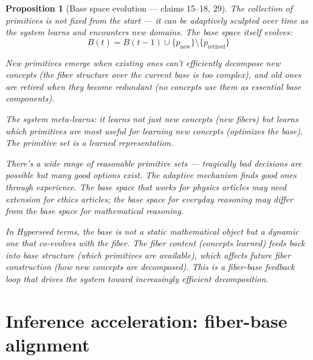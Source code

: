 \documentclass[11pt,a4paper]{article}
\newtheorem{proposition}[definition]{Proposition}
\begin{document}
\begin{proposition}[Base space evolution --- claims 15--18, 29]
\label{prop:adaptive}
The collection of primitives is not fixed from the start --- it can be
adaptively sculpted over time as the system learns and encounters new
domains. The base space itself evolves:
\[
  B(t) = B(t-1) \cup \{p_{\text{new}}\} \setminus \{p_{\text{retired}}\}
\]

New primitives emerge when existing ones can't efficiently decompose new
concepts (the fiber structure over the current base is too complex),
and old ones are retired when they become redundant (no concepts use
them as essential base components).

The system meta-learns: it learns not just new concepts (new fibers)
but learns which primitives are most useful for learning new concepts
(optimizes the base). The primitive set is a learned representation.

There's a wide range of reasonable primitive sets --- tragically bad
decisions are possible but many good options exist. The adaptive
mechanism finds good ones through experience. The base space that works
for physics articles may need extension for ethics articles; the
base space for everyday reasoning may differ from the base space for
mathematical reasoning.

In Hyperseed terms, the base is not a static mathematical object but
a dynamic one that co-evolves with the fiber. The fiber content
(concepts learned) feeds back into base structure (which primitives
are available), which affects future fiber construction (how new
concepts are decomposed). This is a fiber-base feedback loop that
drives the system toward increasingly efficient decomposition.
\end{proposition}

\section{Inference acceleration: fiber-base alignment}
\label{sec:acceleration}
\end{document}
